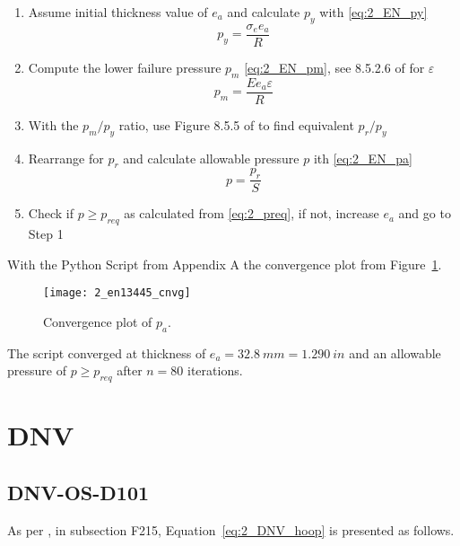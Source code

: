 \begin{enumerate}
	\item Assume initial thickness value of $e_a$ and calculate $p_y$ with \ref{eq:2_EN_py}
		\begin{equation}
			\label{eq:2_EN_py}
			p_y = \frac{\sigma_e e_a}{R}
		\end{equation}
	\item Compute the lower failure pressure $p_m$ \ref{eq:2_EN_pm}, see 8.5.2.6 of \citep{EN134453} for $\varepsilon$
		\begin{equation}
			\label{eq:2_EN_pm}
			p_m = \frac{E e_a  \varepsilon}{R}
		\end{equation}
	\item With the $p_m/p_y$ ratio, use Figure 8.5.5 of \citep{EN134453} to find equivalent $p_r/p_y$
	\item Rearrange for $p_r$ and calculate allowable pressure $p$ ith \ref{eq:2_EN_pa}
		\begin{equation}
			\label{eq:2_EN_pa}
			p = \frac{p_r}{S}
		\end{equation}
	\item Check if $p \geq p_{req}$ as calculated from \ref{eq:2_preq}, if not, increase $e_a$ and go to Step 1 \\
\end{enumerate}

With the Python Script from Appendix A the convergence plot from Figure~\ref{fig:2_en13445_cnvg}.
\begin{figure}[H]
    \centering
    \texttt{[image: 2\_en13445\_cnvg]}
    \caption{Convergence plot of $p_a$.}
    \label{fig:2_en13445_cnvg}
\end{figure}

The script converged at thickness of $e_a = 32.8\ mm = 1.290\ in$ and an allowable pressure of $p\geq p_{req}$ after $n=80$ iterations. 
\pagebreak

\section{DNV}

\subsection{DNV-OS-D101}

As per \citep{DNVOSD101}, in subsection F215, Equation~\ref{eq:2_DNV_hoop} is presented as follows.

